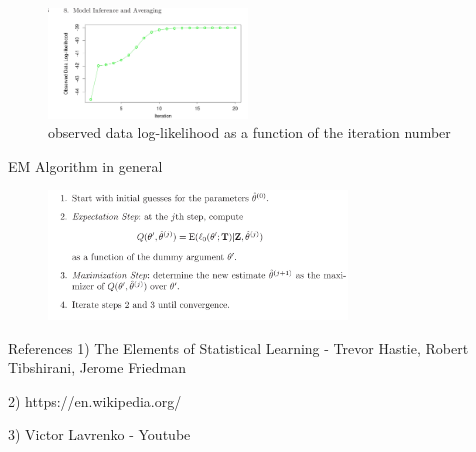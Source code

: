 \documentclass[11pt]{beamer}
\begin{document}
\begin{frame}

\begin{figure}
  \includegraphics[width=200]{fig5.jpg}
  
  \caption{observed data log-likelihood as a function of the iteration number}
  \label{fig:boat1}

\end{figure}

\end{frame}
\begin{frame}
\textsf{EM Algorithm in general}
\begin{figure}
  \includegraphics[width=300]{fig11.png}
  
 

\end{figure}

\end{frame}


\begin{frame}
\textsf{References}
\bigskip
\linebreak
\textsf{1) The Elements of Statistical Learning - Trevor Hastie, Robert Tibshirani, Jerome Friedman}
\medskip
\linebreak 

\textsf{2) https://en.wikipedia.org/}
\medskip
\linebreak 

\textsf{3) Victor Lavrenko - Youtube}
\end{frame}
\end{document}
